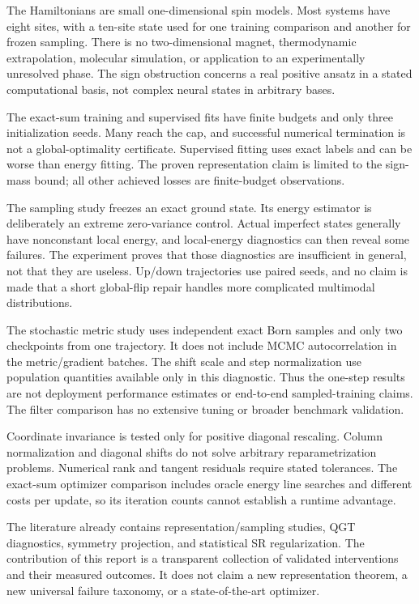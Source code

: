 \documentclass[
  11pt,
  a4paper,
]{article}
\begin{document}
The Hamiltonians are small one-dimensional spin models. Most systems
have eight sites, with a ten-site state used for one training comparison
and another for frozen sampling. There is no two-dimensional magnet,
thermodynamic extrapolation, molecular simulation, or application to an
experimentally unresolved phase. The sign obstruction concerns a real
positive ansatz in a stated computational basis, not complex neural
states in arbitrary bases.

The exact-sum training and supervised fits have finite budgets and only
three initialization seeds. Many reach the cap, and successful numerical
termination is not a global-optimality certificate. Supervised fitting
uses exact labels and can be worse than energy fitting. The proven
representation claim is limited to the sign-mass bound; all other
achieved losses are finite-budget observations.

The sampling study freezes an exact ground state. Its energy estimator
is deliberately an extreme zero-variance control. Actual imperfect
states generally have nonconstant local energy, and local-energy
diagnostics can then reveal some failures. The experiment proves that
those diagnostics are insufficient in general, not that they are
useless. Up/down trajectories use paired seeds, and no claim is made
that a short global-flip repair handles more complicated multimodal
distributions.

The stochastic metric study uses independent exact Born samples and only
two checkpoints from one trajectory. It does not include MCMC
autocorrelation in the metric/gradient batches. The shift scale and step
normalization use population quantities available only in this
diagnostic. Thus the one-step results are not deployment performance
estimates or end-to-end sampled-training claims. The filter comparison
has no extensive tuning or broader benchmark validation.

Coordinate invariance is tested only for positive diagonal rescaling.
Column normalization and diagonal shifts do not solve arbitrary
reparametrization problems. Numerical rank and tangent residuals require
stated tolerances. The exact-sum optimizer comparison includes oracle
energy line searches and different costs per update, so its iteration
counts cannot establish a runtime advantage.

The literature already contains representation/sampling studies, QGT
diagnostics, symmetry projection, and statistical SR regularization. The
contribution of this report is a transparent collection of validated
interventions and their measured outcomes. It does not claim a new
representation theorem, a new universal failure taxonomy, or a
state-of-the-art optimizer.
\end{document}

